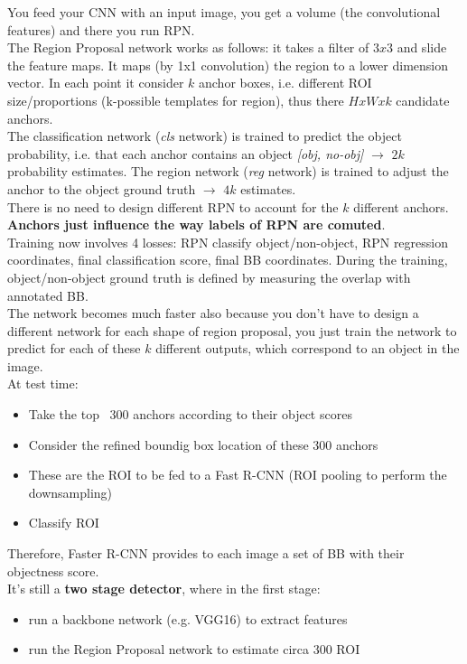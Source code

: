 You feed your CNN with an input image, you get a volume (the convolutional features) and there you run RPN. \\ 
The Region Proposal network works as follows: it takes a filter of $3x3$ and slide the feature maps. It maps (by 1x1 convolution) the region to a lower dimension vector. In each point it consider $k$ anchor boxes, i.e. different ROI size/proportions (k-possible templates for region), thus there  $HxWxk$ candidate anchors.\\
The classification network (\textit{cls} network) is trained to predict the object probability, i.e. that each anchor contains an object \textit{[obj, no-obj]} $\rightarrow$ $2k$ probability estimates.  
The region network (\textit{reg} network) is trained to adjust the anchor to the object ground truth $\rightarrow$ $4k$ estimates.\\
There is no need to design different RPN to account for the $k$ different anchors. \textbf{Anchors just influence the way labels of RPN are comuted}. \\
Training now involves 4 losses: RPN classify object/non-object, RPN regression coordinates, final classification score, final BB coordinates. During the training, object/non-object ground truth is defined by measuring the overlap with annotated BB. \\
The network becomes much faster also because you don't have to design a different network for each shape of region proposal, you just train the network to predict for each of these $k$ different outputs, which correspond to an object in the image. \\
At test time:
\begin{itemize}
    \item Take the top ~300 anchors according to their object scores
    \item Consider the refined boundig box location of these 300 anchors
    \item These are the ROI to be fed to a Fast R-CNN (ROI pooling to perform the downsampling)
    \item Classify ROI
\end{itemize}{}
Therefore, Faster R-CNN provides to each image a set of BB with their objectness score.\\
It's still a \textbf{two stage detector}, where in the first stage:
\begin{itemize}
    \item run a backbone network (e.g. VGG16) to extract features
    \item run the Region Proposal network to estimate circa 300 ROI
\end{itemize}{}

